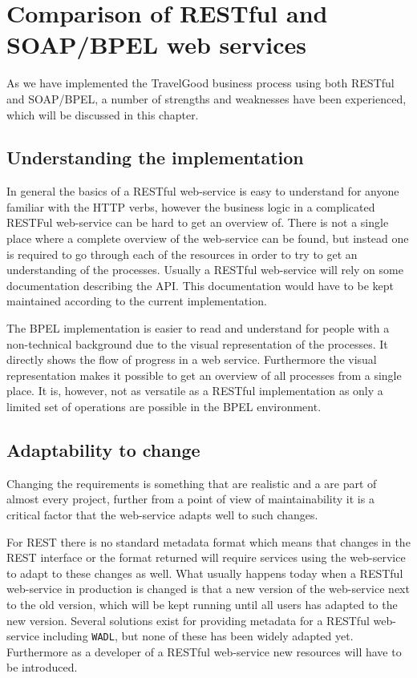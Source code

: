 {\setlength{\chapterfontsize}{26pt}
\chapter{Comparison of RESTful and SOAP/BPEL web services}
}

As we have implemented the TravelGood business process using both RESTful and SOAP/BPEL, a number of strengths and weaknesses have been experienced, which will be discussed in this chapter.


\section{Understanding the implementation}
In general the basics of a RESTful web-service is easy to understand for anyone familiar with the HTTP verbs, however the business logic in a complicated RESTFul web-service can be hard to get an overview of. There is not a single place where a complete overview of the web-service can be found, but instead one is required to go through each of the resources in order to try to get an understanding of the processes. Usually a RESTful web-service will rely on some documentation describing the API. This documentation would have to be kept maintained according to the current implementation. 

The BPEL implementation is easier to read and understand for people with a non-technical background due to the visual representation of the processes. It directly shows the flow of progress in a web service. Furthermore the visual representation makes it possible to get an overview of all processes from a single place. It is, however, not as versatile as a RESTful implementation as only a limited set of operations are possible in the BPEL environment.

\section{Adaptability to change}
Changing the requirements is something that are realistic and a are part of almost every project, further from a point of view of maintainability it is a critical factor that the web-service adapts well to such changes.

For REST there is no standard metadata format which means that changes in the REST interface or the format returned will require services using the web-service to adapt to these changes as well. What usually happens today when a RESTful web-service in production is changed is that a new version of the web-service next to the old version, which will be kept running until all users has adapted to the new version. Several solutions exist for providing metadata for a RESTful web-service including \texttt{WADL}, but none of these has been widely adapted yet. Furthermore as a developer of a RESTful web-service new resources will have to be introduced.

